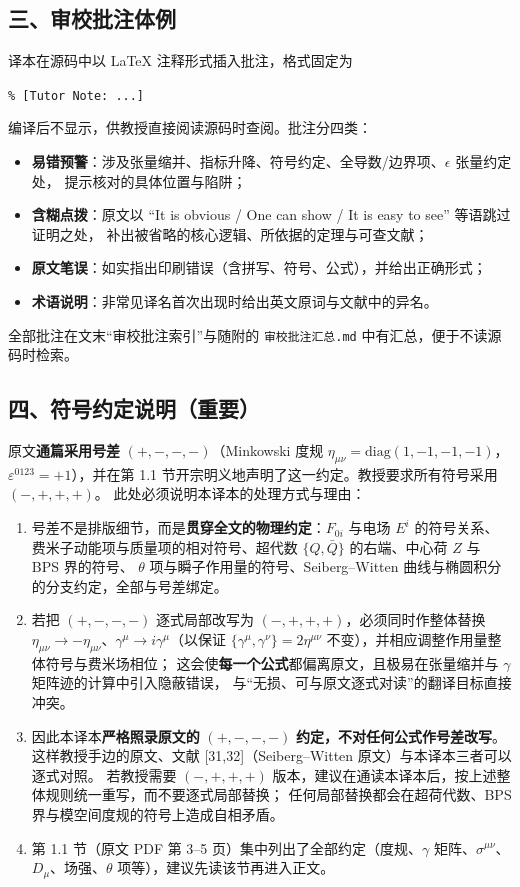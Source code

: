 \subsection*{三、审校批注体例}

译本在源码中以 LaTeX 注释形式插入批注，格式固定为
\begin{center}
\verb|% [Tutor Note: ...]|
\end{center}
编译后不显示，供教授直接阅读源码时查阅。批注分四类：
\begin{itemize}
  \item \textbf{易错预警}：涉及张量缩并、指标升降、符号约定、全导数/边界项、$\epsilon$ 张量约定处，
        提示核对的具体位置与陷阱；
  \item \textbf{含糊点拨}：原文以 “It is obvious / One can show / It is easy to see” 等语跳过证明之处，
        补出被省略的核心逻辑、所依据的定理与可查文献；
  \item \textbf{原文笔误}：如实指出印刷错误（含拼写、符号、公式），并给出正确形式；
  \item \textbf{术语说明}：非常见译名首次出现时给出英文原词与文献中的异名。
\end{itemize}
全部批注在文末“审校批注索引”与随附的 \texttt{审校批注汇总.md} 中有汇总，便于不读源码时检索。

\subsection*{四、符号约定说明（重要）}

原文\textbf{通篇采用号差} $(+,-,-,-)$（Minkowski 度规 $\eta_{\mu\nu}=\mathrm{diag}(1,-1,-1,-1)$，
$\varepsilon^{0123}=+1$），并在第 1.1 节开宗明义地声明了这一约定。教授要求所有符号采用 $(-,+,+,+)$。
此处必须说明本译本的处理方式与理由：

\begin{enumerate}
  \item 号差不是排版细节，而是\textbf{贯穿全文的物理约定}：$F_{0i}$ 与电场 $E^i$ 的符号关系、
        费米子动能项与质量项的相对符号、超代数 $\{Q,\bar Q\}$ 的右端、中心荷 $Z$ 与 BPS 界的符号、
        $\theta$ 项与瞬子作用量的符号、Seiberg--Witten 曲线与椭圆积分的分支约定，全部与号差绑定。
  \item 若把 $(+,-,-,-)$ 逐式局部改写为 $(-,+,+,+)$，必须同时作整体替换
        $\eta_{\mu\nu}\to-\eta_{\mu\nu}$、$\gamma^\mu\to i\gamma^\mu$（以保证
        $\{\gamma^\mu,\gamma^\nu\}=2\eta^{\mu\nu}$ 不变），并相应调整作用量整体符号与费米场相位；
        这会使\textbf{每一个公式}都偏离原文，且极易在张量缩并与 $\gamma$ 矩阵迹的计算中引入隐蔽错误，
        与“无损、可与原文逐式对读”的翻译目标直接冲突。
  \item 因此本译本\textbf{严格照录原文的} $(+,-,-,-)$ \textbf{约定，不对任何公式作号差改写}。
        这样教授手边的原文、文献 [31,32]（Seiberg--Witten 原文）与本译本三者可以逐式对照。
        若教授需要 $(-,+,+,+)$ 版本，建议在通读本译本后，按上述整体规则统一重写，而不要逐式局部替换；
        任何局部替换都会在超荷代数、BPS 界与模空间度规的符号上造成自相矛盾。
  \item 第 1.1 节（原文 PDF 第 3--5 页）集中列出了全部约定（度规、$\gamma$ 矩阵、$\sigma^{\mu\nu}$、
        $D_\mu$、场强、$\theta$ 项等），建议先读该节再进入正文。
\end{enumerate}


